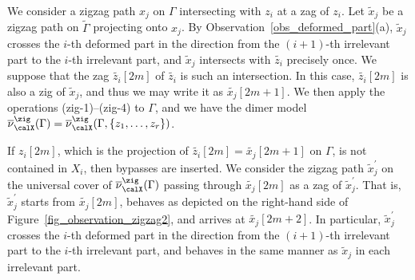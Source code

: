 \begin{observation}
\label{obs_deformed_part3}
We consider a zigzag path $x_j$ on $\Gamma$ intersecting with $z_i$ at a zag of $z_i$.
Let $\widetilde{x}_j$ be a zigzag path on $\widetilde{\Gamma}$ projecting onto $x_j$.
By Observation~\ref{obs_deformed_part}(a), $\widetilde{x}_j$ crosses the $i$-th deformed part in the direction from the $(i+1)$-th irrelevant part to the $i$-th irrelevant part, and $\widetilde{x}_j$ intersects with $\widetilde{z_i}$ precisely once.
We suppose that the zag $\widetilde{z_i}[2m]$ of $\widetilde{z_i}$ is such an intersection.
In this case, $\widetilde{z_i}[2m]$ is also a zig of $\widetilde{x}_j$, and thus we may write it as $\widetilde{x_j}[2m+1]$.
We then apply the operations (zig-1)--(zig-4) to $\Gamma$, and we have the dimer model $\overline{\nu}_\calX^\zig(\Gamma)=\overline{\nu}_\calX^\zig(\Gamma,\{z_1,\dots,z_r\})$.

If $z_i[2m]$, which is the projection of $\widetilde{z_i}[2m]=\widetilde{x_j}[2m+1]$ on $\Gamma$, is not contained in $X_i$, then bypasses are inserted.
We consider the zigzag path $\widetilde{x}^\prime_j$ on the universal cover of $\overline{\nu}_\calX^\zig(\Gamma)$ passing through $\widetilde{x_j}[2m]$ as a zag of $\widetilde{x}^\prime_j$.
That is, $\widetilde{x}^\prime_j$ starts from $\widetilde{x_j}[2m]$, behaves as depicted on the right-hand side of Figure~\ref{fig_observation_zigzag2}, and arrives at $\widetilde{x_j}[2m+2]$.
In particular, $\widetilde{x}^\prime_j$ crosses the $i$-th deformed part in the direction from the $(i+1)$-th irrelevant part to the $i$-th irrelevant part,
and behaves in the same manner as $\widetilde{x}_j$ in each irrelevant part.

\begin{figure}[h!]\centering\vspace*{-31mm}
\end{figure}
\end{observation}
